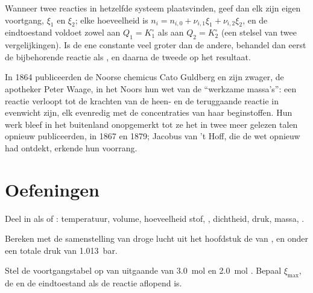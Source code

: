 \begin{method}\label{met:b1:extent-q-and-k:two-reactions}
Wanneer twee reacties in hetzelfde systeem plaatsvinden, geef dan elk zijn
eigen voortgang, $\xi_1$ en $\xi_2$; elke hoeveelheid is
$n_i = n_{i,0} + \nu_{i,1}\xi_1
+ \nu_{i,2}\xi_2$, en de eindtoestand voldoet zowel aan $Q_1 = K_1^\circ$
als aan
$Q_2 = K_2^\circ$ (een stelsel van twee vergelijkingen). Is de ene
constante veel groter dan de andere, behandel dan eerst de bijbehorende
reactie als , en daarna de tweede op het resultaat.
\end{method}

\begin{history}[De massawerkingswet, 1864]
In 1864 publiceerden de Noorse chemicus Cato Guldberg en zijn zwager, de
apotheker Peter Waage, in het Noors hun wet van de ``werkzame massa's'':
een reactie verloopt tot de krachten van de heen- en de teruggaande
reactie in evenwicht zijn, elk evenredig met de concentraties van haar
beginstoffen. Hun werk bleef in het buitenland onopgemerkt tot ze het in
twee meer gelezen talen opnieuw publiceerden, in 1867 en 1879; Jacobus
van 't Hoff, die de wet opnieuw had ontdekt, erkende hun voorrang.
\end{history}

\section{Oefeningen}

\begin{exercise}[$\star$]\label{exo:b1:extent-q-and-k:1}
Deel in als  of : temperatuur, volume, hoeveelheid
stof, , dichtheid, druk, massa, .
\end{exercise}

\begin{exercise}[$\star$]\label{exo:b1:extent-q-and-k:2}
Bereken met de samenstelling van droge lucht uit het hoofdstuk de
 van ,  en  onder een totale druk
van \qty{1.013}{bar}.
\end{exercise}

\begin{exercise}[$\star$]\label{exo:b1:extent-q-and-k:3}
Stel de voortgangstabel op van  uitgaande van
\qty{3.0}{mol}  en \qty{2.0}{mol} . Bepaal $\xi_{\max}$, de
 en de eindtoestand als de reactie aflopend is.
\end{exercise}

